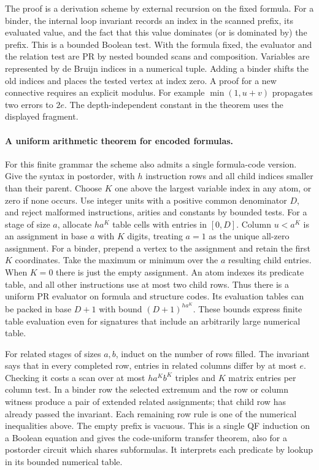 The proof is a derivation scheme by external recursion on the fixed
formula. For a binder, the internal loop invariant records an index in
the scanned prefix, its evaluated value, and the fact that this value
dominates (or is dominated by) the prefix. This is a bounded Boolean
test. With the formula fixed, the evaluator and the relation test are PR
by nested bounded scans and composition. Variables are represented by
de Bruijn indices in a numerical tuple. Adding a binder shifts the old
indices and places the tested vertex at index zero. A proof for a new
connective requires an explicit modulus. For example
$\min(1,u+v)$ propagates two errors to $2e$. The depth-independent
constant in the theorem uses the displayed fragment.

\paragraph{A uniform arithmetic theorem for encoded formulas.}
For this finite grammar the scheme also admits a single formula-code
version. Give the syntax in postorder, with $h$ instruction rows and
all child indices smaller than their parent. Choose $K$ one above the
largest variable index in any atom, or zero if none occurs. Use integer
units with a positive common denominator $D$, and reject malformed
instructions, arities and constants by bounded tests. For a stage of
size $a$, allocate $h a^K$ table cells with entries in $[0,D]$.
Column $u<a^K$ is an assignment in base $a$ with $K$ digits, treating
$a=1$ as the unique all-zero assignment. For a binder, prepend a
vertex to the assignment and retain the first $K$ coordinates.
Take the maximum or minimum over the $a$ resulting child entries.
When $K=0$ there is just the empty assignment. An atom indexes its
predicate table, and all other instructions use at most two child
rows. Thus there is a uniform PR evaluator on formula and structure
codes. Its evaluation tables can be packed in base $D+1$ with bound
$(D+1)^{h a^K}$. These bounds express finite table evaluation even
for signatures that include an arbitrarily large numerical table.

For related stages of sizes $a,b$, induct on the number of rows filled.
The invariant says that in every completed row, entries in related
columns differ by at most $e$. Checking it costs a scan over at most
$h a^K b^K$ triples and $K$ matrix entries per column test. In a binder
row the selected extremum and the row or column witness produce a pair
of extended related assignments; that child row has already passed the
invariant. Each remaining row rule is one of the numerical inequalities
above. The empty prefix is vacuous. This is a single QF induction on
a Boolean equation and gives the code-uniform transfer theorem, also
for a postorder circuit which shares subformulas. It interprets each predicate by lookup in its bounded numerical table.

